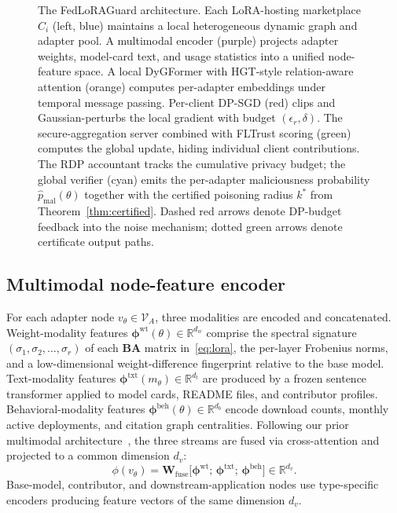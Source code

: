 \documentclass[12pt,a4paper]{article}
\theoremstyle{definition}
\theoremstyle{remark}
\newcommand{\modelname}{FedLoRAGuard}
\newcommand{\R}{\mathbb{R}}
\newcommand{\Vcal}{\mathcal{V}}
\begin{document}
\begin{figure}[!t]
\begin{tikzpicture}
\end{tikzpicture}
\caption{The \modelname{} architecture. Each LoRA-hosting marketplace $C_i$ (left, blue) maintains a local heterogeneous dynamic graph and adapter pool. A multimodal encoder (purple) projects adapter weights, model-card text, and usage statistics into a unified node-feature space. A local DyGFormer with HGT-style relation-aware attention (orange) computes per-adapter embeddings under temporal message passing. Per-client DP-SGD (red) clips and Gaussian-perturbs the local gradient with budget $(\epsilon_r, \delta)$. The secure-aggregation server combined with FLTrust scoring (green) computes the global update, hiding individual client contributions. The RDP accountant tracks the cumulative privacy budget; the global verifier (cyan) emits the per-adapter maliciousness probability $\hat{p}_{\mathrm{mal}}(\theta)$ together with the certified poisoning radius $k^*$ from Theorem~\ref{thm:certified}. Dashed red arrows denote DP-budget feedback into the noise mechanism; dotted green arrows denote certificate output paths.}
\label{fig:architecture}
\end{figure}

\subsection{Multimodal node-feature encoder}
\label{subsec:encoder}

For each adapter node $v_\theta \in \Vcal_A$, three modalities are encoded and concatenated. Weight-modality features $\bm{\phi}^{\mathrm{wt}}(\theta) \in \R^{d_w}$ comprise the spectral signature $(\sigma_1, \sigma_2, \ldots, \sigma_r)$ of each $\mathbf{B}\mathbf{A}$ matrix in~\eqref{eq:lora}, the per-layer Frobenius norms, and a low-dimensional weight-difference fingerprint relative to the base model. Text-modality features $\bm{\phi}^{\mathrm{txt}}(m_\theta) \in \R^{d_t}$ are produced by a frozen sentence transformer applied to model cards, README files, and contributor profiles. Behavioral-modality features $\bm{\phi}^{\mathrm{beh}}(\theta) \in \R^{d_b}$ encode download counts, monthly active deployments, and citation graph centralities. Following our prior multimodal architecture~\cite{anaedevha2025stochastic}, the three streams are fused via cross-attention and projected to a common dimension $d_v$:
\begin{equation}
    \phi(v_\theta) = \mathbf{W}_{\mathrm{fuse}} \bigl[\bm{\phi}^{\mathrm{wt}};\, \bm{\phi}^{\mathrm{txt}};\, \bm{\phi}^{\mathrm{beh}}\bigr] \in \R^{d_v}.
\end{equation}
Base-model, contributor, and downstream-application nodes use type-specific encoders producing feature vectors of the same dimension $d_v$.
\end{document}
